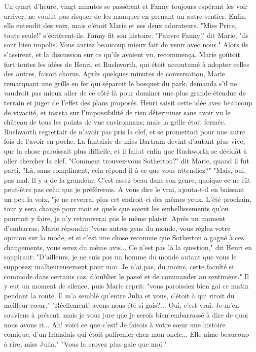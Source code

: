 Un quart d'heure, vingt minutes se passèrent et Fanny toujours espérant les voir arriver, ne voulut pas risquer de les manquer en prenant un autre sentier. Enfin, elle entendit des voix, mais c'étoit Marie et ses deux adorateurs.
"Miss Price, toute seule!" s'écrièrent-ils. Fanny fit son histoire. "Pauvre Fanny!" dit Marie, "ils sont bien impolis. Vous auriez beaucoup mieux fait de venir avec nous." Alors ils s'assirent, et la discussion sur ce qu'ils avoient vu, recommença. Marie goûtoit fort toutes les idées de Henri, et Rushworth, qui étoit accoutumé à adopter celles\setcounter{page}{519} des autres, faisoit chorus. Après quelques minutes de conversation, Marie remarquant une grille en fer qui séparoit le bosquet du park, demanda s'il ne vaudroit pas mieux aller de ce côté là pour dominer une plus grande étendue de terrain et juger de l'effet des plans proposés. Henri saisit cette idée avec beaucoup de vivacité, et insista sur l'impossibilité de rien déterminer sans avoir vu le château de tous les points de vue environnans; mais la grille étoit fermée. Rushworth regrettait de n'avoir pas pris la clef, et se promettoit pour une autre fois de l'avoir en poche. La fantaisie de miss Bartram devint d'autant plus vive, que la chose paroissait plus difficile, et il fallut enfin que Rushworth se décidât à aller chercher la clef.
"Comment trouvez-vous Sotherton?" dit Marie, quand il fut parti. "Là, sans compliment, cela répond-il à ce que vous attendiez?"
"Mais, oui, pas mal. Il y a de la grandeur. C'est assez beau dans son genre, quoique ce ne fût peut-être pas celui que je préférerois. A vous dire le vrai, ajouta-t-il en baissant un peu la voix, "je ne reverrai plus cet endroit-ci des mêmes yeux. L'été prochain, tout y sera changé pour moi: et quels\setcounter{page}{520} que soient les embellissements qu'on pourroit y faire, je n'y retrouverai pas le même plaisir.
Après un moment d'embarras, Marie répondit: "vous autres gens du monde, vous réglez votre opinion sur la mode, et si c'est une chose reconnue que Sotherton a gagné à ces changements, vous serez du même avis... Ce n'est pas là la question," dit Henri en soupirant: "D'ailleurs, je ne suis pas un homme du monde autant que vous le supposez; malheureusement pour moi. Je n'ai pas, du moins, cette faculté si commode dans certains cas, d'oublier le passé et de commander au sentiment."
Il y eut un moment de silence, puis Marie reprit: "vous paroissiez bien gai ce matin pendant la route. Il m'a semblé qu'entre Julia et vous, c'étoit à qui riroit du meilleur cœur."
"Réellement! avons-nous été si gais?... Oui, c'est vrai. Je m'en souviens à présent; mais je vous jure que je serois bien embarrassé à dire de quoi nous avons ri... Ah! voici ce que c'est! Je faisois à votre sœur une histoire comique, d'un Irlandais qui étoit palfrenier chez mon oncle... Elle aime beaucoup à rire, miss Julia."\setcounter{page}{521} "Vous la croyez plus gaie que moi."
